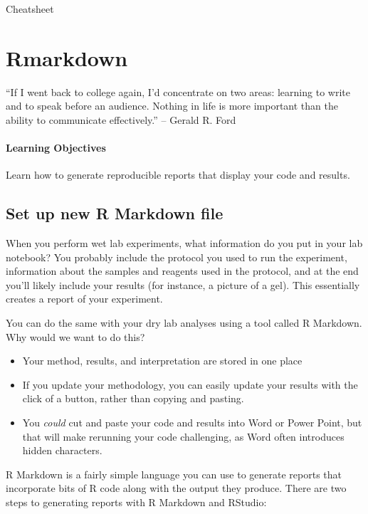 \documentclass[
]{book}
\begin{document}
Cheatsheet

\hypertarget{rmarkdown}{%
\chapter{Rmarkdown}\label{rmarkdown}}

``If I went back to college again, I'd concentrate on two areas: learning to write and to speak before an audience. Nothing in life is more important than the ability to communicate effectively.''
-- Gerald R. Ford

\hypertarget{learning-objectives-3}{%
\subsubsection*{Learning Objectives}\label{learning-objectives-3}}

Learn how to generate reproducible reports that display your code and results.

\hypertarget{set-up-new-r-markdown-file}{%
\section{Set up new R Markdown file}\label{set-up-new-r-markdown-file}}

When you perform wet lab experiments, what information do you put in your lab notebook? You probably include the protocol you used to run the experiment, information about the samples and reagents used in the protocol, and at the end you'll likely include your results (for instance, a picture of a gel). This essentially creates a report of your experiment.

You can do the same with your dry lab analyses using a tool called R Markdown. Why would we want to do this?

\begin{itemize}
\item
  Your method, results, and interpretation are stored in one place
\item
  If you update your methodology, you can easily update your results with the click of a button, rather than copying and pasting.
\item
  You \emph{could} cut and paste your code and results into Word or Power Point, but that will make rerunning your code challenging, as Word often introduces hidden characters.
\end{itemize}

R Markdown is a fairly simple language you can use to generate reports that incorporate bits of R code along with the output they produce. There are two steps to generating reports with R Markdown and RStudio:
\end{document}
